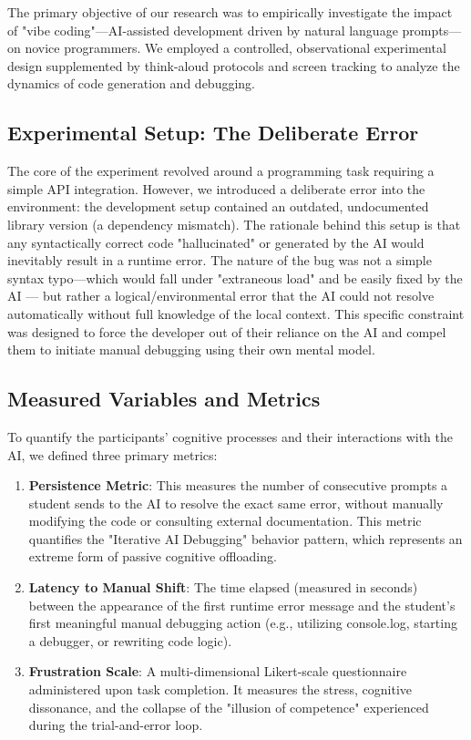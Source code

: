 \documentclass[../tanulmany.tex]{subfiles}
\begin{document}
The primary objective of our research was to empirically investigate the impact of "vibe coding"—AI-assisted development 
driven by natural language prompts—on novice programmers. We employed a controlled, observational experimental design 
supplemented by think-aloud protocols and screen tracking to analyze the dynamics of code generation and debugging.
\cite{prather2018metacognitive} \cite{prather2024widening}

\subsection{Experimental Setup: The Deliberate Error}
The core of the experiment revolved around a programming task requiring a simple API integration. However, we introduced 
a deliberate error into the environment: the development setup contained an outdated, undocumented library version (a dependency mismatch).
The rationale behind this setup is that any syntactically correct code "hallucinated" or generated by the AI would inevitably result in a runtime error. 
The nature of the bug was not a simple syntax typo—which would fall under "extraneous load" and be easily fixed by the 
AI — but rather a logical/environmental error that the AI could not resolve automatically without full knowledge of the local context. This specific constraint was designed to force the developer out of their reliance on the AI and compel them to initiate manual debugging using their own mental model.

\subsection{Measured Variables and Metrics}

To quantify the participants' cognitive processes and their interactions with the AI, we defined three primary metrics:
\begin{enumerate}
    \item \textbf{Persistence Metric}: This measures the number of consecutive prompts a student sends to the AI to resolve the exact same error, without manually modifying the code or consulting external documentation. This metric quantifies the "Iterative AI Debugging" behavior pattern, which represents an extreme form of passive cognitive offloading. \cite{shen2026how}
    \item \textbf{Latency to Manual Shift}: The time elapsed (measured in seconds) between the appearance of the first runtime error message and the student's first meaningful manual debugging action (e.g., utilizing console.log, starting a debugger, or rewriting code logic).
    \item \textbf{Frustration Scale}: A multi-dimensional Likert-scale questionnaire administered upon task completion. It measures the stress, cognitive dissonance, and the collapse of the "illusion of competence" experienced during the trial-and-error loop. \cite{prather2024widening}
\end{enumerate}
\end{document}
